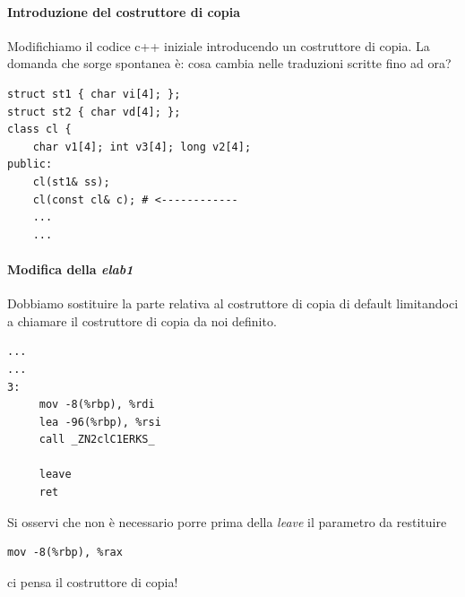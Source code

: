 \documentclass[11pt]{report}
\theoremstyle{definition}
\begin{document}
\paragraph{Introduzione del costruttore di copia}
Modifichiamo il codice c++ iniziale introducendo un costruttore di copia. La domanda che sorge spontanea è: cosa cambia nelle traduzioni scritte fino ad ora? 
\begin{verbatim}
struct st1 { char vi[4]; };
struct st2 { char vd[4]; };
class cl {
    char v1[4]; int v3[4]; long v2[4];
public:
    cl(st1& ss);
    cl(const cl& c); # <------------
    ...
    ...
\end{verbatim}
\paragraph{Modifica della \emph{elab1}} Dobbiamo sostituire la parte relativa al costruttore di copia di default limitandoci a chiamare il costruttore di copia da noi definito.
\begin{verbatim}
...
...
3:
     mov -8(%rbp), %rdi
     lea -96(%rbp), %rsi
     call _ZN2clC1ERKS_
     
     leave
     ret
\end{verbatim}
Si osservi che non è necessario porre prima della \emph{leave} il parametro da restituire
\begin{verbatim}
mov -8(%rbp), %rax
\end{verbatim}
ci pensa il costruttore di copia!
\end{document}
